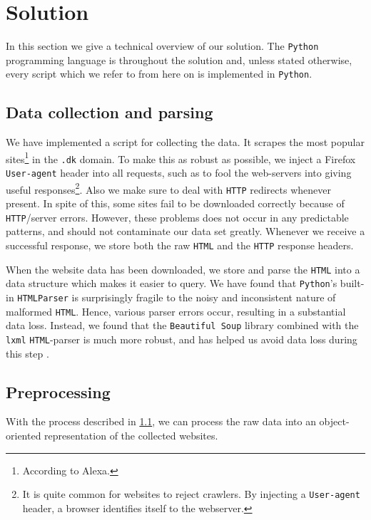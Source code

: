 \section{Solution}
\label{sec:solution}

In this section we give a technical overview of our solution. The \texttt{Python} programming language is throughout the solution and, unless stated otherwise, every script which we refer to from here on is implemented in \texttt{Python}.

\subsection{Data collection and parsing}
\label{subsec:scraping}

We have implemented a script for collecting the data. It scrapes the most popular sites\footnote{According to Alexa.} in the \texttt{.dk} domain. To make this as robust as possible, we inject a Firefox \texttt{User-agent} header into all requests, such as to fool the web-servers into giving useful responses\footnote{It is quite common for websites to reject crawlers. By injecting a \texttt{User-agent} header, a browser identifies itself to the webserver.}. Also we make sure to deal with \texttt{HTTP} redirects whenever present. In spite of this, some sites fail to be downloaded correctly because of \texttt{HTTP}/server errors. However, these problems does not occur in any predictable patterns, and should not contaminate our data set greatly. Whenever we receive a successful response, we store both the raw \texttt{HTML} and the \texttt{HTTP} response headers.

When the website data has been downloaded, we store and parse the \texttt{HTML} into a data structure which makes it easier to query. We have found that \texttt{Python}'s built-in \texttt{HTMLParser} is surprisingly fragile to the noisy and inconsistent nature of malformed \texttt{HTML}. Hence, various parser errors occur, resulting in a substantial data loss. Instead, we found that the \texttt{Beautiful Soup} library combined with the \texttt{lxml} \texttt{HTML}-parser is much more robust, and has helped us avoid data loss during this step \cite{beautiful_soup, lxml}.

\subsection{Preprocessing}
\label{subsec:preprocessing}

With the process described in \ref{subsec:scraping}, we can process the raw data into an object-oriented representation of the collected websites.

